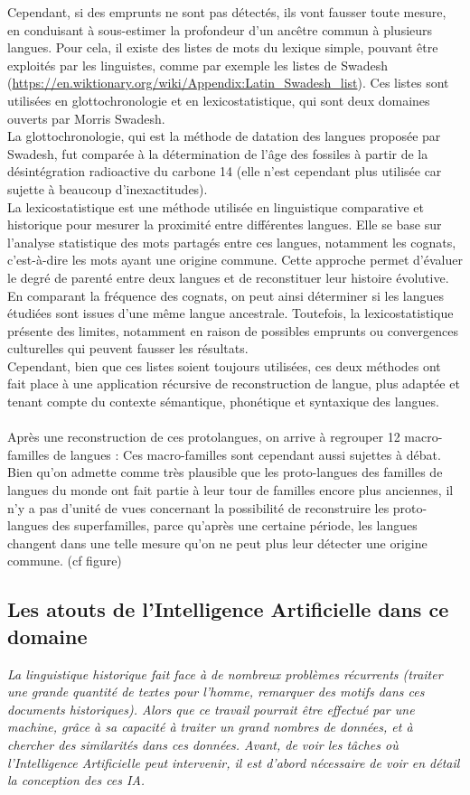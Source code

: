 \documentclass[12pt, french, twoside]{report}
\begin{document}
Cependant, si des emprunts ne sont pas détectés, ils vont fausser toute mesure, en conduisant à sous-estimer la profondeur d'un ancêtre commun à plusieurs langues. Pour cela, il existe des listes de mots du lexique simple, pouvant être exploités par les linguistes, comme par exemple les listes de Swadesh (\url{https://en.wiktionary.org/wiki/Appendix:Latin_Swadesh_list}). Ces listes sont utilisées en glottochronologie et en lexicostatistique, qui sont deux domaines ouverts par Morris Swadesh.\\

La glottochronologie, qui est la méthode de datation des langues proposée par Swadesh, fut comparée à la détermination de l'âge des fossiles à partir de la désintégration radioactive du carbone 14 (elle n'est cependant plus utilisée car sujette à beaucoup d'inexactitudes). \\
\indent La lexicostatistique est une méthode utilisée en linguistique comparative et historique pour mesurer la proximité entre différentes langues. Elle se base sur l'analyse statistique des mots partagés entre ces langues, notamment les cognats, c'est-à-dire les mots ayant une origine commune. Cette approche permet d'évaluer le degré de parenté entre deux langues et de reconstituer leur histoire évolutive. En comparant la fréquence des cognats, on peut ainsi déterminer si les langues étudiées sont issues d'une même langue ancestrale. Toutefois, la lexicostatistique présente des limites, notamment en raison de possibles emprunts ou convergences culturelles qui peuvent fausser les résultats.
\\ \indent Cependant, bien que ces listes soient toujours utilisées,  ces deux méthodes ont fait place à une application récursive de reconstruction de langue, plus adaptée et tenant compte du contexte sémantique, phonétique et syntaxique des langues.
\\ \\ 
\indent Après une reconstruction de ces protolangues, on arrive à regrouper 12 macro-familles de langues :  
Ces macro-familles sont cependant aussi sujettes à débat. Bien qu'on admette comme très plausible que les proto-langues des familles de langues du monde ont fait partie à leur tour de familles encore plus anciennes, il n'y a pas d'unité de vues concernant la possibilité de reconstruire les proto-langues des superfamilles, parce qu'après une certaine période, les langues changent dans une telle mesure qu'on ne peut plus leur détecter une origine commune. (cf figure) 
\subsection{Les atouts de l'Intelligence Artificielle dans ce domaine}
\textit{La linguistique historique fait face à de nombreux problèmes récurrents (traiter une grande quantité de textes pour l'homme, remarquer des motifs dans ces documents historiques). Alors que ce travail pourrait être effectué par une machine, grâce à sa capacité à traiter un grand nombres de données, et à chercher des similarités dans ces données. Avant, de voir les tâches où l'Intelligence Artificielle peut intervenir, il est d'abord nécessaire de voir en détail la conception des ces IA.}
\end{document}
